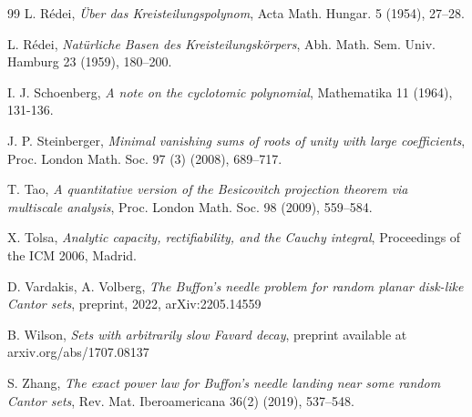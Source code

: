 \begin{thebibliography}{99}
 L. R\'edei, {\it \"Uber das Kreisteilungspolynom}, Acta Math. Hungar. 5 (1954), 27--28.

 L. R\'edei, {\it Nat\"urliche Basen des Kreisteilungsk\"orpers}, Abh. Math. Sem. Univ. Hamburg 23 (1959), 180--200.

I. J. Schoenberg, {\it A note on the cyclotomic polynomial}, Mathematika 11 (1964), 131-136.

 J. P. Steinberger, {\it Minimal vanishing sums of roots of unity with large coefficients},
Proc. London Math. Soc. 97 (3) (2008), 689--717.

 T. Tao, {\it A quantitative version of the Besicovitch projection
theorem via multiscale analysis},  Proc. London Math. Soc. 98 (2009), 559--584.

 X. Tolsa, {\it Analytic capacity, rectifiability, and the Cauchy integral}, Proceedings of the ICM 2006, Madrid.

 D. Vardakis, A. Volberg, {\it The Buffon's needle problem for random planar disk-like Cantor sets}, preprint, 2022, arXiv:2205.14559

 B. Wilson, {\it Sets with arbitrarily slow Favard decay}, preprint available at arxiv.org/abs/1707.08137

 S. Zhang, {\it The exact power law for Buffon's needle landing near some random Cantor sets}, Rev. Mat. Iberoamericana 36(2) (2019), 537--548.
 
\end{thebibliography}

